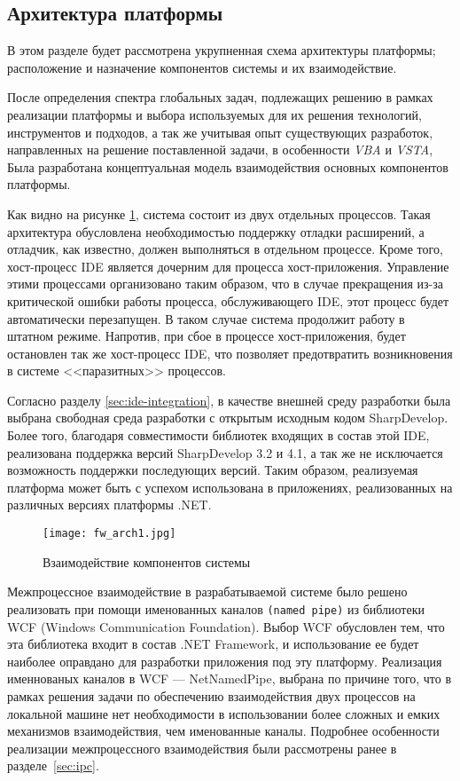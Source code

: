 \subsection{Архитектура платформы}

В этом разделе будет рассмотрена укрупненная схема архитектуры платформы; расположение и назначение компонентов системы и их взаимодействие.

После определения спектра глобальных задач, подлежащих решению в рамках реализации платформы и выбора используемых для их решения технологий, инструментов и подходов, а так же учитывая опыт существующих разработок, направленных на решение поставленной задачи, в особенности {\it VBA} и {\it VSTA}, Была разработана концептуальная модель взаимодействия основных компонентов платформы.

Как видно на рисунке \ref{fw_arch1}, система состоит из двух отдельных процессов. Такая архитектура обусловлена необходимостью поддержку отладки расширений, а отладчик, как известно, должен выполняться в отдельном процессе. Кроме того, хост-процесс IDE является дочерним для процесса хост-приложения. Управление этими процессами организовано таким образом, что в случае прекращения из-за критической ошибки работы процесса, обслуживающего IDE, этот процесс будет автоматически перезапущен. В таком случае система продолжит работу в штатном режиме. Напротив, при сбое в процессе хост-приложения, будет остановлен так же хост-процесс IDE, что позволяет предотвратить возникновения в системе <<паразитных>> процессов.

Согласно разделу \ref{sec:ide-integration}, в качестве внешней среду разработки была выбрана свободная среда разработки с открытым исходным кодом SharpDevelop. Более того, благодаря совместимости библиотек входящих в состав этой IDE, реализована поддержка версий SharpDevelop 3.2 и 4.1, а так же не исключается возможность поддержки последующих версий. Таким образом, реализуемая платформа может быть с успехом использована в приложениях, реализованных на различных версиях платформы .NET.

\begin{figure}[!h]
    \centering
    \texttt{[image: fw\_arch1.jpg]}
    \caption{Взаимодействие компонентов системы}
    \label{fw_arch1}
\end{figure}

Межпроцессное взаимодействие в разрабатываемой системе было решено реализовать при помощи именованных каналов {\tt (named pipe)} из библиотеки WCF (Windows Communication Foundation). Выбор WCF обусловлен тем, что эта библиотека входит в состав .NET Framework, и использование ее будет наиболее оправдано для разработки приложения под эту платформу. Реализация именнованых каналов в WCF --- NetNamedPipe, выбрана по причине того, что в рамках решения задачи по обеспечению взаимодействия двух процессов на локальной машине нет необходимости в использовании более сложных и емких механизмов взаимодействия, чем именованные каналы. Подробнее особенности реализации межпроцессного взаимодействия были рассмотрены ранее в разделе~\ref{sec:ipc}.

